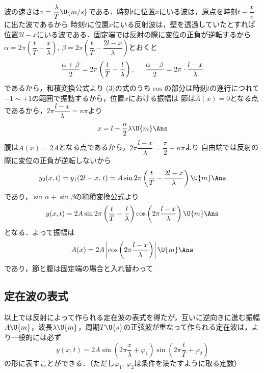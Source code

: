 \begin{reidaiunit}
\begin{kaitou}
\begin{komon}
 波の速さは$v=\dfrac{\lambda}{T}\U{m/s}$である．時刻$t$に位置$x$にいる波は，原点を時刻$t-\dfrac{x}{v}$に出た波であるから
 時刻$t$に位置$x$にいる反射波は，壁を透過していたとすれば位置$2l-x$にいる波である．固定端では反射の際に変位の正負が逆転するから
 $\alpha=2\pi\left(\dfrac{t}{T}-\dfrac{x}{\lambda}\right)$, $\beta=2\pi\left(\dfrac{t}{T}-\dfrac{2l-x}{\lambda}\right)$とおくと
       \[\frac{\alpha+\beta}{2}=2\pi\left(\frac{t}{T}-\frac{l}{\lambda}\right),\hspace{5mm}\frac{\alpha-\beta}{2}=2\pi\cdot\frac{l-x}{\lambda}\]
       であるから，和積変換公式より
 (3)の式のうち$\cos$の部分は時刻$t$の進行につれて$-1\sim+1$の範囲で振動するから，位置$x$における振幅は
 節は$A(x)=0$となる点であるから，$2\pi\dfrac{l-x}{\lambda}=n\pi$より
       \[x=l-\frac{n}{2}\lambda\U{m}\Ans\]
       腹は$A(x)=2A$となる点であるから，$2\pi\dfrac{l-x}{\lambda}=\dfrac{\pi}{2}+n\pi$より
 自由端では反射の際に変位の正負が逆転しないから
       \[y_2(x,t)=y_1(2l-x,\,t)=A\sin 2\pi\left(\frac{t}{T}-\frac{2l-x}{\lambda}\right)\U{m}\Ans\]
       であり，$\sin\alpha+\sin\beta$の和積変換公式より
       \[y(x,t)=2A\sin 2\pi\left(\frac{t}{T}-\frac{l}{\lambda}\right)\cos\left(2\pi\frac{l-x}{\lambda}\right)\U{m}\Ans\]
       となる．よって振幅は
       \[A(x)=2A\left|\cos\left(2\pi\frac{l-x}{\lambda}\right)\right|\U{m}\Ans\]
       であり，節と腹は固定端の場合と入れ替わって
\end{komon}
\end{kaitou}
\end{reidaiunit}

\bsNeed{20mm}
\subsection{定在波の表式}
以上では反射によって作られる定在波の表式を得たが，互いに逆向きに進む振幅$A\U{m}$，波長$\lambda\U{m}$，周期$T\U{s}$の正弦波が重なって作られる定在波は，より一般的には必ず
\[y(x,t)=2A\sin\left(2\pi\frac{x}{\lambda}+\varphi_1\right)\sin\left(2\pi\frac{t}{T}+\varphi_2\right)\]
の形に表すことができる．（ただし$\varphi_1$, $\varphi_2$は条件を満たすように取る定数）

